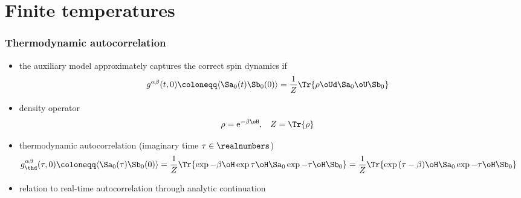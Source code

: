 \section{ Finite temperatures }

\begin{frame}
	\frametitle{ Thermodynamic autocorrelation }
    \begin{itemize}
        \item the auxiliary model approximately captures the correct spin dynamics if
        \begin{align*}
            g^{\alpha\beta}(t,0) &\coloneqq \langle \Sa_0 (t) \Sb_0 (0) \rangle = \frac{1}{Z} \Tr{ \rho \oUd \Sa_0 \oU \Sb_0 }
        \end{align*}
        \item density operator 
        \begin{align*}
            \rho&=\mathrm{e}^{-\beta \oH}, & Z &= \Tr{\rho}
        \end{align*}
        \item thermodynamic autocorrelation (imaginary time $\tau\in\realnumbers$)
        \begin{align*}
            g^{\alpha\beta}_{\thd}(\tau,0) &\coloneqq \langle \Sa_0 (\tau) \Sb_0 (0) \rangle = \frac{1}{Z} \Tr{ \exp{-\beta\oH} \exp{\tau\oH} \Sa_0 \exp{-\tau\oH} \Sb_0 } = \frac{1}{Z} \Tr{ \exp{(\tau-\beta)\oH} \Sa_0 \exp{-\tau\oH} \Sb_0 }
        \end{align*}
        \item relation to real-time autocorrelation through analytic continuation
    \end{itemize}
\end{frame}

